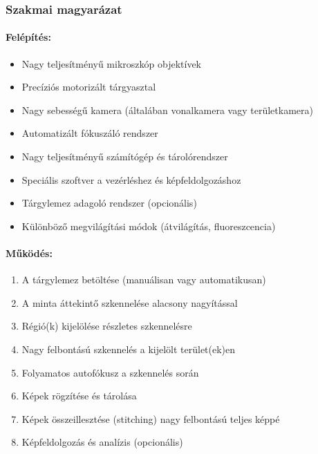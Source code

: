 \documentclass[a4paper,12pt]{article}
\begin{document}
\subsubsection{Szakmai magyarázat}

\paragraph{Felépítés:} \begin{itemize} \item Nagy teljesítményű mikroszkóp objektívek \item Precíziós motorizált tárgyasztal \item Nagy sebességű kamera (általában vonalkamera vagy területkamera) \item Automatizált fókuszáló rendszer \item Nagy teljesítményű számítógép és tárolórendszer \item Speciális szoftver a vezérléshez és képfeldolgozáshoz \item Tárgylemez adagoló rendszer (opcionális) \item Különböző megvilágítási módok (átvilágítás, fluoreszcencia) \end{itemize}

\paragraph{Működés:} \begin{enumerate} \item A tárgylemez betöltése (manuálisan vagy automatikusan) \item A minta áttekintő szkennelése alacsony nagyítással \item Régió(k) kijelölése részletes szkennelésre \item Nagy felbontású szkennelés a kijelölt terület(ek)en \item Folyamatos autofókusz a szkennelés során \item Képek rögzítése és tárolása \item Képek összeillesztése (stitching) nagy felbontású teljes képpé \item Képfeldolgozás és analízis (opcionális) \end{enumerate}
\end{document}
